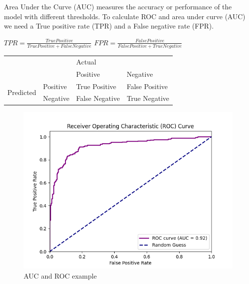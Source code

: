 
Area Under the Curve (AUC) measures the accuracy or performance of the model with different thresholds. To calculate ROC and area under curve (AUC) we need a True positive rate (TPR) and a False negative rate (FPR). 

\(TPR = \frac{TruePositive}{TruePositive + FalseNegative}\)
\(FPR = \frac{FalsePositive}{FalsePositive + TrueNegative}\)


\begin{table}[h]
\begin{tabular}{ll|ll|}
\cline{3-4}
 &  & \multicolumn{2}{l|}{Actual}              \\ \cline{3-4} 
 &  & \multicolumn{1}{l|}{Positive} & Negative \\ \hline
\multicolumn{1}{|l|}{\multirow{2}{*}{Predicted}} & Positive & \multicolumn{1}{l|}{True Positive}  & False Positive \\ \cline{2-4} 
\multicolumn{1}{|l|}{}                           & Negative & \multicolumn{1}{l|}{False Negative} & True Negative  \\ \hline
\end{tabular}
\end{table}

\begin{figure}[h]
    \centering
    \includegraphics[width=1\linewidth]{template//figures/roc_curve_example1.png}
    \caption{AUC and ROC example}
    \label{fig:enter-label}
\end{figure}





